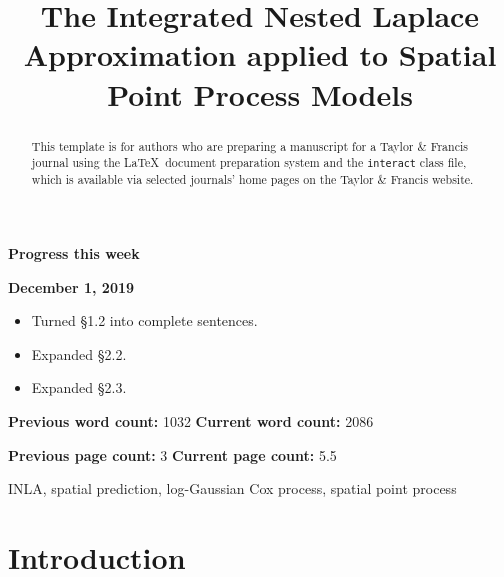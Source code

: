 \documentclass[]{interact}
\begin{document}
{\Large\bf Progress this week}

{\large\bf December 1, 2019}

\begin{itemize}

\item Turned \S 1.2 into complete sentences.

\item Expanded \S 2.2.

\item Expanded \S 2.3.

\end{itemize}

\vfill

\textbf{Previous word count:} 1032 \hfill \textbf{Current word count:} 2086

\textbf{Previous page count:} 3 \hfill \textbf{Current page count:} 5.5

\pagebreak


\title{The Integrated Nested Laplace Approximation applied to Spatial Point Process Models}

\author{
}

\maketitle

\begin{abstract}
This template is for authors who are preparing a manuscript for a Taylor \& Francis journal using the \LaTeX\ document preparation system and the \texttt{interact} class file, which is available via selected journals' home pages on the Taylor \& Francis website.
\end{abstract}

\begin{keywords}
INLA, spatial prediction, log-Gaussian Cox process, spatial point process
\end{keywords}


\section{Introduction}
\end{document}
